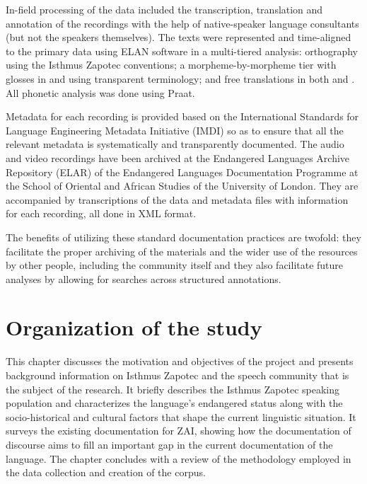 In-field processing of the data included the transcription, translation and annotation of the recordings with the help of native-speaker language consultants (but not the speakers themselves). The texts were represented and time-aligned to the primary data using ELAN software in a multi-tiered analysis: orthography using the Isthmus Zapotec conventions; a morpheme-by-morpheme tier with glosses in  and  using transparent terminology; and free translations in both  and . All phonetic analysis was done using Praat. 

\largerpage
Metadata for each recording is provided based on the International Standards for Language Engineering Metadata Initiative (IMDI) so as to ensure that all the relevant metadata is systematically and transparently documented. The audio and video recordings have been archived at the Endangered Languages Archive Repository (ELAR) of the Endangered Languages Documentation Programme at the School of Oriental and African Studies of the University of London. They are accompanied by transcriptions of the data and metadata files with information for each recording, all done in XML format. 	

The benefits of utilizing these standard documentation practices are twofold: they facilitate the proper archiving of the materials and the wider use of the resources by other people, including the community itself and they also facilitate future analyses by allowing for searches across structured annotations.



\section{Organization of the study}

This chapter discusses the motivation and objectives of the project and presents background information on Isthmus Zapotec and the speech community that is the subject of the research. It briefly describes the Isthmus Zapotec speaking population and characterizes the language's endangered status along with the socio-historical and cultural factors that shape the current linguistic situation. It surveys the existing documentation for ZAI, showing how the documentation of discourse aims to fill an important gap in the current documentation of the language. The chapter concludes with a review of the methodology employed in the data collection and creation of the corpus.

